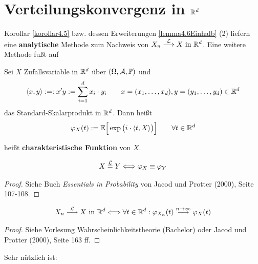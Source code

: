 \section{Verteilungskonvergenz in \texorpdfstring{$\mathbb{R}^d$}{R\textasciicircum d}}
Korollar \ref{korollar4.5} bzw. dessen Erweiterungen \ref{lemma4.6Einhalb} (2) liefern eine \textbf{analytische} Methode zum Nachweis von $X_n\stackrel{\mathcal{L}}{\longrightarrow}X\text{ in }\mathbb{R}^d$. 
Eine weitere Methode fußt auf

\begin{definition}\label{def5.1}
	Sei $X$ Zufallsvariable in $\mathbb{R}^d$ über $(\Omega,\mathcal{A},\mathbb{P})$ und
	\begin{align*}
		\langle x,y\rangle:=:x'y:=\sum\limits_{i=1}^d x_i\cdot y_i\qquad x=(x_1,\ldots,x_d),y=(y_1,\ldots,y_d)\in\mathbb{R}^d
	\end{align*}
	das Standard-Skalarprodukt in $\mathbb{R}^d$. Dann heißt
	\begin{align*}
		\varphi_X(t):=\mathbb{E}\Big[\exp\big(i\cdot\langle t,X\rangle\big)\Big]\qquad\forall t\in\mathbb{R}^d
	\end{align*}
\end{definition}
heißt \textbf{charakteristische Funktion} von $X$.

\begin{satz}[Eindeutigkeitssatz]\label{satz5.2Eindeutigkeitssatz}
	\begin{align*}
		X\stackrel{\mathcal{L}}{=} Y\Longleftrightarrow\varphi_X\equiv\varphi_Y
	\end{align*}
\end{satz}

\begin{proof}
	Siehe Buch \textit{Essentials in Probability} von Jacod und Protter (2000), Seite 107-108.
\end{proof}

\begin{satz}[Stetigkeitssatz]\label{satz5.3Stetigkeitssatz}
	\begin{align*}
		X_n\stackrel{\mathcal{L}}{\longrightarrow} X\text{ in }\mathbb{R}^d\Longleftrightarrow\forall t\in\mathbb{R}^d: \varphi_{X_n}(t)\stackrel{n\to\infty}{\longrightarrow}\varphi_X(t)
	\end{align*}
\end{satz}

\begin{proof}
	Siehe Vorlesung Wahrscheinlichkeitstheorie (Bachelor) oder Jacod und Protter (2000), Seite 163 ff.
\end{proof}

Sehr nützlich ist:

